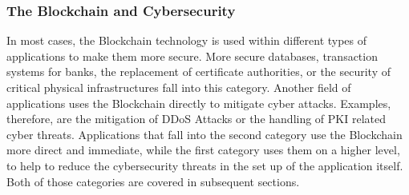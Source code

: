\subsubsection{The Blockchain and Cybersecurity}
In most cases, the Blockchain technology is used within different types of applications to make them more secure. More secure databases, transaction systems for banks, the replacement of certificate authorities, or the security of critical physical infrastructures fall into this category. Another field of applications uses the Blockchain directly to mitigate cyber attacks. Examples, therefore, are the mitigation of DDoS Attacks or the handling of PKI related cyber threats. Applications that fall into the second category use the Blockchain more direct and immediate, while the first category uses them on a higher level, to help to reduce the cybersecurity threats in the set up of the application itself. Both of those categories are covered in subsequent sections.
